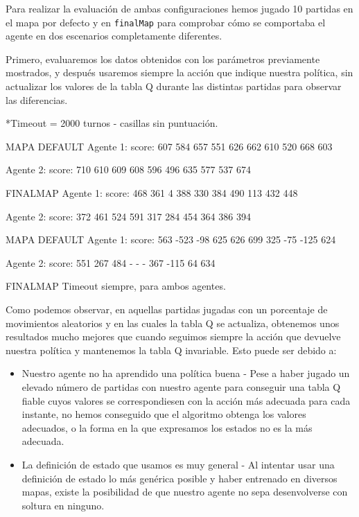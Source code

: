 \documentclass[12pt]{article}
\begin{document}
Para realizar la evaluación de ambas configuraciones hemos jugado 10 partidas en el mapa por defecto y en \texttt{finalMap} para comprobar cómo se comportaba el agente en dos escenarios completamente diferentes.

Primero, evaluaremos los datos obtenidos con los parámetros previamente mostrados, y después usaremos siempre la acción que indique nuestra política, sin actualizar los valores de la tabla Q durante las distintas partidas para observar las diferencias.

*Timeout = 2000 turnos - casillas sin puntuación.

MAPA DEFAULT
Agente 1:
score:	607		584		657		551		626		662		610		520		668		603

Agente 2:
score:	710		610		609		608		596		496		635		577		537		674

FINALMAP
Agente 1:
score:	468		361		4		388		330		384		490		113		432		448

Agente 2:
score:	372		461		524		591		317		284		454		364		386		394

MAPA DEFAULT
Agente 1:
score:	563		-523	-98		625		626		699		325		-75		-125	624

Agente 2:
score:	551		267		484		-		-		-		367		-115	64		634

FINALMAP
Timeout siempre, para ambos agentes.

Como podemos observar, en aquellas partidas jugadas con un porcentaje de movimientos aleatorios y en las cuales la tabla Q se actualiza, obtenemos unos resultados mucho mejores que cuando seguimos siempre la acción que devuelve nuestra política y mantenemos la tabla Q invariable. Esto puede ser debido a:

\begin{itemize}
	\item Nuestro agente no ha aprendido una política buena - Pese a haber jugado un elevado número de partidas con nuestro agente para conseguir una tabla Q fiable cuyos valores se correspondiesen con la acción más adecuada para cada instante, no hemos conseguido que el algoritmo obtenga los valores adecuados, o la forma en la que expresamos los estados no es la más adecuada.
	\item La definición de estado que usamos es muy general - Al intentar usar una definición de estado lo más genérica posible y haber entrenado en diversos mapas, existe la posibilidad de que nuestro agente no sepa desenvolverse con soltura en ninguno.
\end{itemize}
\end{document}
